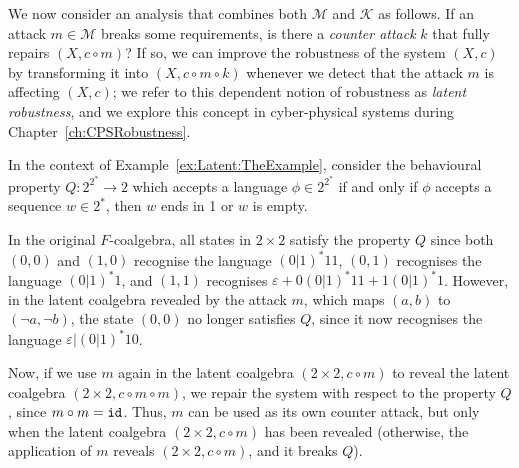 We now consider an analysis that combines both $\mathcal{M}$ and $\mathcal{K}$ as follows. If an attack $m\in \mathcal{M}$ breaks some requirements, is there a \emph{counter attack} $k$ that fully repairs $(X,c\circ m)$? If so, we can improve the robustness of the system $(X,c)$ by transforming it into $(X,c\circ m \circ k)$ whenever we detect that the attack $m$ is affecting $(X,c)$; we refer to this dependent notion of robustness as \emph{latent robustness}, and we explore this concept in cyber-physical systems during Chapter~\ref{ch:CPSRobustness}.
\begin{example}
    In the context of Example~\ref{ex:Latent:TheExample}, consider the behavioural property $Q\colon 2^{2^*}\rightarrow 2$ which accepts a language $\phi \in 2^{2^*}$ if and only if $\phi$ accepts a sequence $w\in 2^*$, then $w$ ends in 1 or $w$ is empty.

    In the original $F$-coalgebra, all states in $2\times 2$ satisfy the property $Q$ since both $(0,0)$ and $(1,0)$ recognise the language $(0|1)^*11$, $(0,1)$ recognises the language $(0|1)^*1$, and $(1,1)$ recognises $\varepsilon + 0(0|1)^*11 + 1(0|1)^*1$. However, in the latent coalgebra revealed by the attack $m$, which maps $(a,b)$ to $(\lnot a, \lnot b)$, the state $(0,0)$ no longer satisfies $Q$, since it now recognises the language $\varepsilon|(0|1)^*10$. 

    Now, if we use $m$ again in the latent coalgebra $(2\times 2, c\circ m)$ to reveal the latent coalgebra $(2\times 2, c\circ m\circ m)$, we repair the system with respect to the property $Q$, since $m \circ m={\texttt{id}}$. Thus, $m$ can be used as its own counter attack, but only when the latent coalgebra $(2\times 2, c\circ m)$ has been revealed (otherwise, the application of $m$ reveals $(2\times 2, c\circ m)$, and it breaks $Q$).
\end{example}




